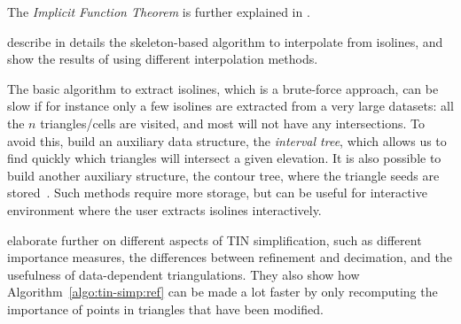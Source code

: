 The \emph{Implicit Function Theorem} is further explained in \citet{Sibson97}.

\citet{Dakowicz03} describe in details the skeleton-based algorithm to interpolate from isolines, and show the results of using different interpolation methods.

The basic algorithm to extract isolines, which is a brute-force approach, can be slow if for instance only a few isolines are extracted from a very large datasets: all the $n$ triangles/cells are visited, and most will not have any intersections.
To avoid this, \citet{vanKreveld96} build an auxiliary data structure, the \emph{interval tree}, which allows us to find quickly which triangles will intersect a given elevation.
It is also possible to build another auxiliary structure, the contour tree, where the triangle seeds are stored~\citep{vanKreveld97-1}.
Such methods require more storage, but can be useful for interactive environment where the user extracts isolines interactively.

\citet{Garland95} elaborate further on different aspects of TIN simplification, such as different importance measures, the differences between refinement and decimation, and the usefulness of data-dependent triangulations. 
They also show how Algorithm~\ref{algo:tin-simp:ref} can be made a lot faster by only recomputing the importance of points in triangles that have been modified. 


